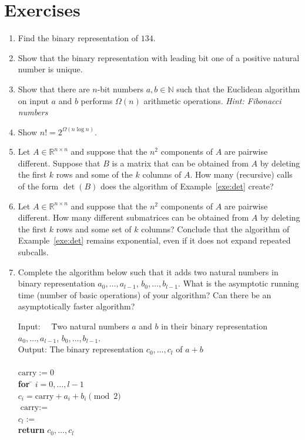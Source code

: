 \section*{Exercises} 


\begin{enumerate}
\item Find the binary representation of $134$. 
\item Show that the binary representation with leading bit one of a positive natural number is
 unique. \label{alg:ex2}
\item Show that there are $n$-bit numbers $a,b ∈ ℕ$ such that the  Euclidean algorithm on input $a$ and $b$ performs  $\Omega(n)$ arithmetic operations. \emph{Hint: Fibonacci numbers} 
\item Show $n! =  2^{\Omega({n \log n})}$. 
\item 
Let $A ∈ ℝ^{n ×n}$  and suppose that the $n^2$ components of $A$ are pairwise different.
Suppose that $B$ is a matrix that can be obtained from $A$ by deleting the first $k$ rows and some of the $k$ columns of $A$. How many (recursive) calls of the form $\det(B)$ does the algorithm of Example~\ref{exe:det} create? 
\item Let $A ∈ ℝ^{n ×n}$  and suppose that the $n^2$ components of $A$ are pairwise different. How many different submatrices can be obtained from $A$ by deleting the first $k$ rows and some set of $k$ columns? Conclude that the algorithm  of Example~\ref{exe:det} remains exponential, even if it does not expand repeated subcalls. 
\item Complete the  algorithm below such  that it adds two natural numbers  in binary representation  $a_0,\dots,a_{l-1}$,  $b_0,\dots,b_{l-1}$. What is the asymptotic running time (number of basic operations) of your algorithm? Can there be an asymptotically  faster algorithm? 

  \begin{tabbing}
    Input:~~ \= Two natural numbers $a$ and $b$  in their binary representation\\ 
    \>   $a_0,\dots,a_{l-1}$, $b_0,\dots,b_{l-1}$. \\
    Output: \> The binary representation $c_0,\dots,c_l$ of $a+b$ \\
\pushtabs 	
\\
   $\mathrm{carry} := 0$ \\
   {\bf for} \= $i=0, \dots, l-1$ \\
             \> $c_i = \mathrm{carry} + a_i + b_i \pmod{2} $\\
             \> $\mbox{carry} := $ \\
   $c_l := $  \\
   {\bf return} $c_0,\dots ,c_l$ \\   
\poptabs
  \end{tabbing} \label{item:ex:7}

\end{enumerate}

